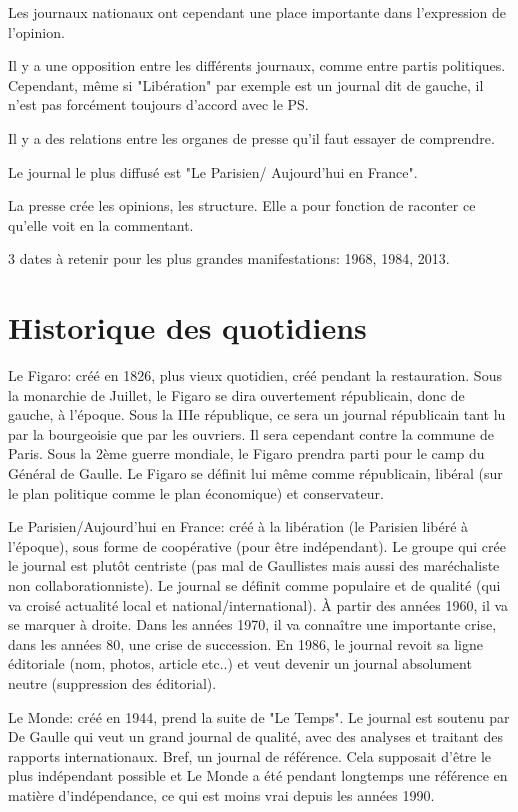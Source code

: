 \documentclass[12pt, a4paper, openany]{book}
\begin{document}
Les journaux nationaux ont cependant une place importante dans l'expression de l'opinion. 

Il y a une opposition entre les différents journaux, comme entre partis politiques. Cependant, même si "Libération" par exemple est un journal dit de gauche, il n'est pas forcément toujours d'accord avec le PS. 

Il y a des relations entre les organes de presse qu'il faut essayer de comprendre.

Le journal le plus diffusé est "Le Parisien/ Aujourd'hui en France". 

La presse crée les opinions, les structure. Elle a pour fonction de raconter ce qu'elle voit en la commentant.

3 dates à retenir pour les plus grandes manifestations: 1968, 1984, 2013.

\section{Historique des quotidiens}

Le Figaro: créé en 1826, plus vieux quotidien, créé pendant la restauration. Sous la monarchie de Juillet, le Figaro se dira ouvertement républicain, donc de gauche, à l'époque. Sous la IIIe république, ce sera un journal républicain tant lu par la bourgeoisie que par les ouvriers. Il sera cependant contre la commune de Paris. Sous la 2ème guerre mondiale, le Figaro prendra parti pour le camp du Général de Gaulle. Le Figaro se définit lui même comme républicain, libéral (sur le plan politique comme le plan économique) et conservateur.


Le Parisien/Aujourd'hui en France: créé à la libération (le Parisien libéré à l'époque), sous forme de coopérative (pour être indépendant). Le groupe qui crée le journal est plutôt centriste (pas mal de Gaullistes mais aussi des maréchaliste non collaborationniste). Le journal se définit comme populaire et de qualité (qui va croisé actualité local et national/international). À partir des années 1960, il va se marquer à droite. Dans les années 1970, il va connaître une importante crise, dans les années 80, une crise de succession. En 1986, le journal revoit sa ligne éditoriale (nom, photos, article etc..) et veut devenir un journal absolument neutre (suppression des éditorial).


Le Monde: créé en 1944, prend la suite de "Le Temps". Le journal est soutenu par De Gaulle qui veut un grand journal de qualité, avec des analyses et traitant des rapports internationaux. Bref, un journal de référence. Cela supposait d'être le plus indépendant possible et Le Monde a été pendant longtemps une référence en matière d'indépendance, ce qui est moins vrai depuis les années 1990.
\end{document}
